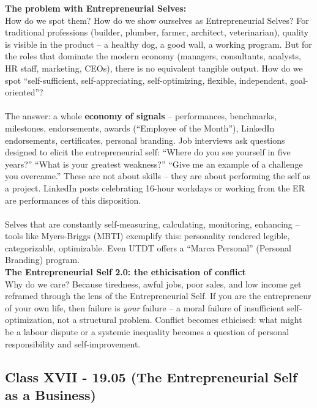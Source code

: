 \documentclass[a4paper,12pt]{article}
\begin{document}
\noindent \textbf{The problem with Entrepreneurial Selves:} \\
\noindent How do we spot them? How do we show ourselves as Entrepreneurial Selves? For traditional professions (builder, plumber, farmer, architect, veterinarian), quality is visible in the product -- a healthy dog, a good wall, a working program. But for the roles that dominate the modern economy (managers, consultants, analysts, HR staff, marketing, CEOs), there is no equivalent tangible output. How do we spot ``self-sufficient, self-appreciating, self-optimizing, flexible, independent, goal-oriented''? \\
\\
\noindent The answer: a whole \textbf{economy of signals} -- performances, benchmarks, milestones, endorsements, awards (``Employee of the Month''), LinkedIn endorsements, certificates, personal branding. Job interviews ask questions designed to elicit the entrepreneurial self: ``Where do you see yourself in five years?'' ``What is your greatest weakness?'' ``Give me an example of a challenge you overcame.'' These are not about skills -- they are about performing the self as a project. LinkedIn posts celebrating 16-hour workdays or working from the ER are performances of this disposition. \\
\\
\noindent Selves that are constantly self-measuring, calculating, monitoring, enhancing -- tools like Myers-Briggs (MBTI) exemplify this: personality rendered legible, categorizable, optimizable. Even UTDT offers a ``Marca Personal'' (Personal Branding) program. \\

\noindent \textbf{The Entrepreneurial Self 2.0: the ethicisation of conflict} \\
\noindent Why do we care? Because tiredness, awful jobs, poor sales, and low income get reframed through the lens of the Entrepreneurial Self. If you are the entrepreneur of your own life, then failure is \emph{your} failure -- a moral failure of insufficient self-optimization, not a structural problem. Conflict becomes ethicised: what might be a labour dispute or a systemic inequality becomes a question of personal responsibility and self-improvement.

\subsection*{Class XVII - 19.05 (The Entrepreneurial Self as a Business)}
\end{document}

